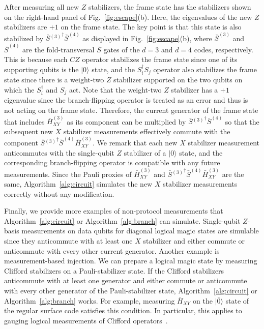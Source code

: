 \documentclass[
 reprint,
 amsmath,amssymb,
 pra,superscriptaddress, nofootinbib
]{revtex4-2}
\theoremstyle{definition}
\theoremstyle{plain}
\begin{document}
%
After measuring all new $Z$ stabilizers, the frame state has the stabilizers shown on the right-hand panel of Fig.~\ref{fig:escape}(b). Here, the eigenvalues of the new $Z$ stabilizers are $+1$ on the frame state. 
The key point is that this state is also stabilized by $\bar{S}{^{(3)}}^\dagger \bar{S}^{(4)}$ as displayed in Fig.~\ref{fig:escape}(b), where $\bar{S}^{(3)}$ and $\bar{S}^{(4)}$ are the fold-transversal $\bar{S}$ gates of the $d=3$ and $d=4$ codes, respectively.
This is because each $CZ$ operator stabilizes the frame state since one of its supporting qubits is the $|0 \rangle$ state, and the $S^\dagger_i S_j$ operator also stabilizes the frame state since there is a weight-two $Z$ stabilizer supported on the two qubits on which the $S^\dagger_i$ and $S_j$ act.
Note that the weight-two $Z$ stabilizer has a $+1$ eigenvalue since the branch-flipping operator is treated as an error and thus is not acting on the frame state. 
Therefore, the current generator of the frame state that includes $\bar{H}^{(3)}_{XY}$ as its component can be multiplied by $\bar{S}{^{(3)}}^\dagger \bar{S}^{(4)}$ so that the subsequent new $X$ stabilizer measurements effectively commute with the component $\bar{S}{^{(3)}}^\dagger \bar{S}^{(4)}\bar{H}^{(3)}_{XY}$.
We remark that each new $X$ stabilizer measurement anticommutes with the single-qubit $Z$ stabilizer of a $|0\rangle$ state, and the corresponding branch-flipping operator is compatible with any future measurements. Since the Pauli proxies of $\bar{H}^{(3)}_{XY}$ and $\bar{S}{^{(3)}}^\dagger \bar{S}^{(4)}\bar{H}^{(3)}_{XY}$ are the same, Algorithm~\ref{alg:circuit} simulates the new $X$ stabilizer measurements correctly without any modification. 

Finally, we provide more examples of non-protocol measurements that Algorithm~\ref{alg:circuit} or Algorithm~\ref{alg:branch} can simulate.
Single-qubit $Z$-basis measurements on data qubits for diagonal logical magic states are simulable since they anticommute with at least one $X$ stabilizer and either commute or anticommute with every other current generator.
Another example is measurement-based injection. We can prepare a logical magic state by measuring Clifford stabilizers on a Pauli-stabilizer state. 
If the Clifford stabilizers anticommute with at least one generator and either commute or anticommute with every other generator of the Pauli-stabilizer state, Algorithm~\ref{alg:circuit} or Algorithm~\ref{alg:branch} works. For example, measuring $\bar{H}_{XY}$ on the $|\bar{0}\rangle$ state of the regular surface code satisfies this condition. 
In particular, this applies to gauging logical measurements of Clifford operators~\cite{vrty-qs5h}. 
\end{document}
